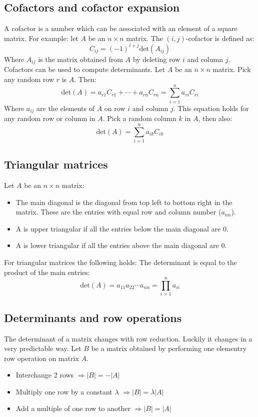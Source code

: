 \documentclass[11pt, a4paper]{article}
\begin{document}
\subsection{Cofactors and cofactor expansion}
A cofactor is a number which can be associated with an element of a square matrix. For example:
let $A$ be an $n \times n$ matrix. The $(i,j)$-cofactor is defined as:
\begin{equation}
  C_{ij} = (-1)^{i+j}\text{det}(A_{ij})
\end{equation}
Where $A_{ij}$ is the matrix obtained from $A$ by deleting row $i$ and column $j$.
Cofactors can be used to compute determinants. Let $A$ be an $n \times n$ matrix. Pick any random row $r$ is $A$. Then:
\begin{equation}
  \text{det}(A) = a_{r1}C_{r1} + \cdots + a_{rn}C_{rn} = \sum_{i=1}^{n} a_{ri}C_{ri}
\end{equation}
Where $a_{ij}$ are the elements of $A$ on row $i$ and column $j$. This equation holds for any random row or column in $A$. Pick a random column $k$ in $A$, then also:
\begin{equation}
  \text{det}(A)= \sum_{i=1}^{n} a_{ik}C_{ik}
\end{equation}


\subsection{Triangular matrices}
Let $A$ be an $n \times n$ matrix:
\begin{itemize}
  \item The main diagonal is the diagonal from top left to bottom right in the matrix. These are the entries with equal row and column number ($a_{nn}$).
  \item A is upper triangular if all the entries below the main diagonal are 0.
  \item A is lower triangular if all the entries above the main diagonal are 0.
\end{itemize}
For triangular matrices the following holds:
The determinant is equal to the product of the main entries:
\begin{equation}
  \text{det}(A) = a_{11}a_{22} \cdots a_{nn} = \prod_{i=1}^{n} a_{ii}
\end{equation}


\subsection{Determinants and row operations}
The determinant of a matrix changes with row reduction. Luckily it changes in a very predictable way. Let $B$ be a matrix obtained by performing one elementry row operation on matrix $A$.
\begin{itemize}
  \item Interchange 2 rows $\Rightarrow |B| = -|A|$
  \item Multiply one row by a constant $\lambda$ $\Rightarrow |B| = \lambda|A|$
  \item Add a multiple of one row to another $\Rightarrow |B| = |A|$
\end{itemize}
\end{document}
